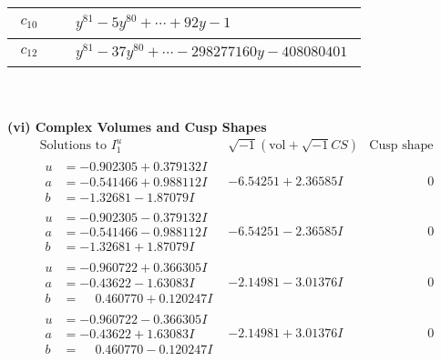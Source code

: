 \documentclass[1p]{elsarticle_modified}
\theoremstyle{definition}
\newcommand{\I}{\sqrt{-1}}
\begin{document}
\begin{tabular}{m{50pt}|m{274pt}}
\hline $$\begin{aligned}c_{10}\end{aligned}$$&$\begin{aligned}
&y^{81}-5 y^{80}+\cdots+92 y-1
\end{aligned}$\\
\hline $$\begin{aligned}c_{12}\end{aligned}$$&$\begin{aligned}
&y^{81}-37 y^{80}+\cdots-298277160 y-408080401
\end{aligned}$\\
\hline
\end{tabular}\\~\\
\newpage\flushleft \textbf{(vi) Complex Volumes and Cusp Shapes}
$$\begin{array}{c|c|c}  
\text{Solutions to }I^u_{1}& \I (\text{vol} + \sqrt{-1}CS) & \text{Cusp shape}\\
 \hline 
\begin{aligned}
u &= -0.902305 + 0.379132 I \\
a &= -0.541466 + 0.988112 I \\
b &= -1.32681 - 1.87079 I\end{aligned}
 & -6.54251 + 2.36585 I & \phantom{-0.000000 } 0 \\ \hline\begin{aligned}
u &= -0.902305 - 0.379132 I \\
a &= -0.541466 - 0.988112 I \\
b &= -1.32681 + 1.87079 I\end{aligned}
 & -6.54251 - 2.36585 I & \phantom{-0.000000 } 0 \\ \hline\begin{aligned}
u &= -0.960722 + 0.366305 I \\
a &= -0.43622 - 1.63083 I \\
b &= \phantom{-}0.460770 + 0.120247 I\end{aligned}
 & -2.14981 - 3.01376 I & \phantom{-0.000000 } 0 \\ \hline\begin{aligned}
u &= -0.960722 - 0.366305 I \\
a &= -0.43622 + 1.63083 I \\
b &= \phantom{-}0.460770 - 0.120247 I\end{aligned}
 & -2.14981 + 3.01376 I & \phantom{-0.000000 } 0 \\ \hline\begin{aligned}

\end{aligned}
\end{array}$$
\end{document}
